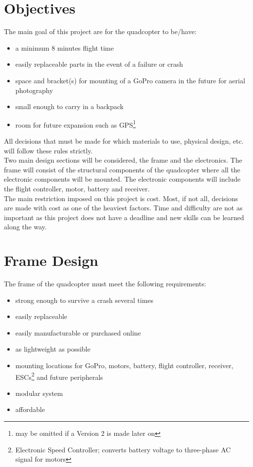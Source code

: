 \documentclass[12pt]{article}
\begin{document}
\section{Objectives}

The main goal of this project are for the quadcopter to be/have:
\renewcommand{\labelitemi}{\textperiodcentered}
\begin{itemize}
\item a minimum 8 minutes flight time
\item easily replaceable parts in the event of a failure or crash
\item space and bracket(s) for mounting of a GoPro camera in the future for aerial photography
\item small enough to carry in a backpack
\item room for future expansion such as GPS\footnote[1]{may be omitted if a Version 2 is made later on}
\end{itemize}

All decisions that must be made for which materials to use, physical design, etc. will follow these rules strictly.
\\

Two main design sections will be considered, the frame and the electronics. The frame will consist of the structural components of the quadcopter where all the electronic components will be mounted. The electronic components will include the flight controller, motor, battery and receiver. 
\\

The main restriction imposed on this project is cost. Most, if not all, decisions are made with cost as one of the heaviest factors. Time and difficulty are not as important as this project does not have a deadline and new skills can be learned along the way.

\section{Frame Design}

The frame of the quadcopter must meet the following requirements:
\renewcommand{\labelitemi}{\textperiodcentered}
\begin{itemize}
\item strong enough to survive a crash several times
\item easily replaceable
\item easily manufacturable or purchased online
\item as lightweight as possible
\item mounting locations for GoPro, motors, battery, flight controller, receiver, ESCs\footnote[1]{Electronic Speed Controller; converts battery voltage to three-phase AC signal for motors} and future peripherals
\item modular system
\item affordable
\end{itemize}
\end{document}
